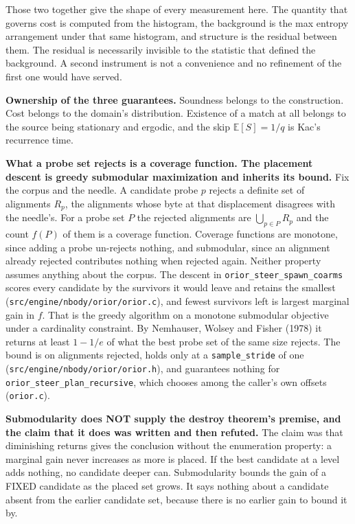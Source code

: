 Those two together give the shape of every measurement here. The quantity that governs cost is computed from the histogram, the background is the max entropy arrangement under that same histogram, and structure is the residual between them. The residual is necessarily invisible to the statistic that defined the background. A second instrument is not a convenience and no refinement of the first one would have served.

\textbf{Ownership of the three guarantees.} Soundness belongs to the construction. Cost belongs to the domain's distribution. Existence of a match at all belongs to the source being stationary and ergodic, and the skip \(\mathbb{E}[S] = 1/q\) is Kac's recurrence time.

\textbf{What a probe set rejects is a coverage function. The placement descent is greedy submodular maximization and inherits its bound.} Fix the corpus and the needle. A candidate probe \(p\) rejects a definite set of alignments \(R_p\), the alignments whose byte at that displacement disagrees with the needle's. For a probe set \(P\) the rejected alignments are \(\bigcup_{p \in P} R_p\) and the count \(f(P)\) of them is a coverage function. Coverage functions are monotone, since adding a probe un-rejects nothing, and submodular, since an alignment already rejected contributes nothing when rejected again. Neither property assumes anything about the corpus. The descent in \texttt{orior\_steer\_spawn\_coarms} scores every candidate by the survivors it would leave and retains the smallest (\texttt{src/\allowbreak{}engine/\allowbreak{}nbody/\allowbreak{}orior/\allowbreak{}orior.c}), and fewest survivors left is largest marginal gain in \(f\). That is the greedy algorithm on a monotone submodular objective under a cardinality constraint. By Nemhauser, Wolsey and Fisher (1978) it returns at least \(1 - 1/e\) of what the best probe set of the same size rejects. The bound is on alignments rejected, holds only at a \texttt{sample\_stride} of one (\texttt{src/\allowbreak{}engine/\allowbreak{}nbody/\allowbreak{}orior/\allowbreak{}orior.h}), and guarantees nothing for \texttt{orior\_steer\_plan\_recursive}, which chooses among the caller's own offsets (\texttt{orior.c}).

\textbf{Submodularity does NOT supply the destroy theorem's premise, and the claim that it does was written and then refuted.} The claim was that diminishing returns gives the conclusion without the enumeration property: a marginal gain never increases as more is placed. If the best candidate at a level adds nothing, no candidate deeper can. Submodularity bounds the gain of a FIXED candidate as the placed set grows. It says nothing about a candidate absent from the earlier candidate set, because there is no earlier gain to bound it by.

